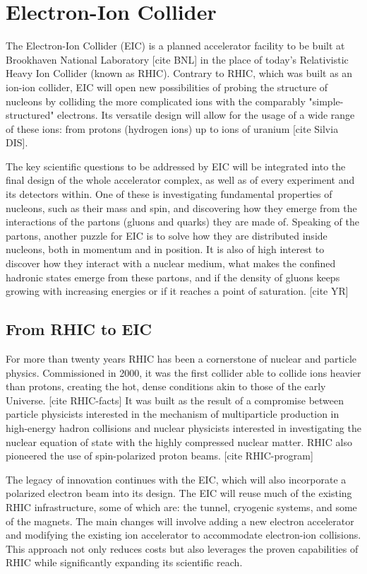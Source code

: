 \chapter{Electron-Ion Collider}\label{cha:EIC} %

The Electron-Ion Collider (EIC) is a planned accelerator facility to be built at Brookhaven National Laboratory [cite BNL] in the place of today's Relativistic Heavy Ion Collider (known as RHIC). Contrary to RHIC, which was built as an ion-ion collider, EIC will open new possibilities of probing the structure of nucleons by colliding the more complicated ions  with the comparably "simple-structured" electrons. Its versatile design will allow for the usage of a wide range of these ions: from protons (hydrogen ions) up to ions of uranium [cite Silvia DIS].

The key scientific questions to be addressed by EIC will be integrated into the final design of the whole accelerator complex, as well as of every experiment and its detectors within. One of these is investigating fundamental properties of nucleons, such as their mass and spin, and discovering how they emerge from the interactions of the partons (gluons and quarks) they are made of. Speaking of the partons, another puzzle for EIC is to solve how they are distributed inside nucleons, both in momentum and in position. It is also of high interest to discover how they interact with a nuclear medium, what makes the confined hadronic states emerge from these partons, and if the density of gluons keeps growing with increasing energies or if it reaches a point of saturation. [cite YR]

\section{From RHIC to EIC}
For more than twenty years RHIC has been a cornerstone of nuclear and particle physics. Commissioned in 2000, it was the first collider able to collide ions heavier than protons, creating the hot, dense conditions akin to those of the early Universe. [cite RHIC-facts] It was built as the result of a compromise between particle physicists interested in the mechanism of multiparticle production in high-energy hadron collisions and nuclear physicists interested in investigating the nuclear equation of state with the highly compressed nuclear matter. RHIC also pioneered the use of spin-polarized proton beams. [cite RHIC-program]

The legacy of innovation continues with the EIC, which will also incorporate a polarized electron beam into its design. The EIC will reuse much of the existing RHIC infrastructure, some of which are: the tunnel, cryogenic systems, and some of the magnets. The main changes will involve adding a new electron accelerator and modifying the existing ion accelerator to accommodate electron-ion collisions. This approach not only reduces costs but also leverages the proven capabilities of RHIC while significantly expanding its scientific reach.



